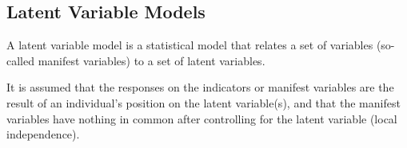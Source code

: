 \subsection{Latent Variable Models}
A latent variable model is a statistical model that relates a set of variables (so-called manifest variables) to a set of latent variables.

It is assumed that the responses on the indicators or manifest variables are the result of an individual's position on the latent variable(s), and that the manifest variables have nothing in common after controlling for the latent variable (local independence).


